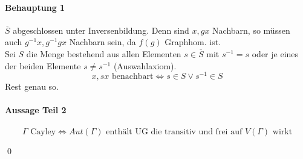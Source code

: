 \documentclass{article}
\begin{document}
\paragraph{Behauptung 1}
$\overline{S}$ abgeschlossen unter Inversenbildung. Denn sind $x, gx$ Nachbarn, so müssen auch $g^{-1}x, g^{-1}gx$ Nachbarn sein, da $f(g)$ Graphhom. ist.\\

Sei $S$ die Menge bestehend aus allen Elementen $s\in \overline{S}$ mit $s^{-1} = s$ oder je eines der beiden Elemente $s \neq s^{-1}$ (Auswahlaxiom).
\[ x, sx \text{ benachbart} \Longleftrightarrow s \in S \vee s^{-1} \in S  \]
Rest genau so.

\paragraph{Aussage Teil 2}
\[\Gamma \text{ Cayley} \Longleftrightarrow Aut(\Gamma) \text{ enthält UG die transitiv und frei auf } V(\Gamma) \text{ wirkt} \]

\qed
\end{document}
